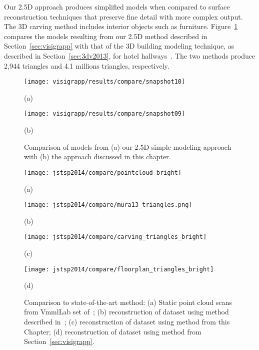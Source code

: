 \documentclass[12pt,onecolumn,oneside]{book}
\begin{document}
Our 2.5D approach produces simplified models when compared to surface reconstruction techniques that preserve fine detail with more complex output.  The 3D carving method includes interior objects such as furniture.  Figure~\ref{fig:visigrapp_compare_to_carving} compares the models resulting from our 2.5D method described in Section~\ref{sec:visigrapp} with that of the 3D building modeling technique, as described in Section~\ref{sec:3dv2013}, for hotel hallways~\cite{Turner13,Turner14}.  The two methods produce 2,944 triangles and 4.1 millions triangles, respectively.

\begin{figure}
   \centering
   \begin{minipage}[b]{0.49\linewidth}
   \texttt{[image: visigrapp/results/compare/snapshot10]}
   \centerline{(a)}
   \end{minipage}
   \hfill
   \begin{minipage}[b]{0.49\linewidth}
   \texttt{[image: visigrapp/results/compare/snapshot09]}
   \centerline{(b)}
   \end{minipage}
   \caption[Comparison of 2.5D simple model with a 3D carved model.]{Comparison of models from (a) our 2.5D simple modeling approach with (b) the approach discussed in this chapter.}
   \label{fig:visigrapp_compare_to_carving}
\end{figure}

\begin{figure}[t]

	\begin{minipage}[b]{0.58\linewidth}
		\centerline{\texttt{[image: jstsp2014/compare/pointcloud\_bright]}}
		\centerline{(a)}\medskip
	\end{minipage}
	\hfill
	\begin{minipage}[b]{0.4\linewidth}
		\centerline{\texttt{[image: jstsp2014/compare/mura13\_triangles.png]}}
		\centerline{(b)}\medskip
	\end{minipage}
	\hfill
	\begin{minipage}[b]{0.58\linewidth}
		\centerline{\texttt{[image: jstsp2014/compare/carving\_triangles\_bright]}}
		\centerline{(c)}\medskip
	\end{minipage}
	\hfill
	\begin{minipage}[b]{0.4\linewidth}
		\centerline{\texttt{[image: jstsp2014/compare/floorplan\_triangles\_bright]}}
		\centerline{(d)}\medskip
	\end{minipage}

	\caption[Comparison of models to existing approach.]{Comparison to state-of-the-art method: (a) Static point cloud scans from VmmlLab set of~\cite{Mattausch14}; (b) reconstruction of dataset using method described in~\cite{Mura13}; (c) reconstruction of dataset using method from this Chapter; (d) reconstruction of dataset using method from Section~\ref{sec:visigrapp}.}
	\label{fig:stateofartcompare}

\end{figure}
\end{document}
